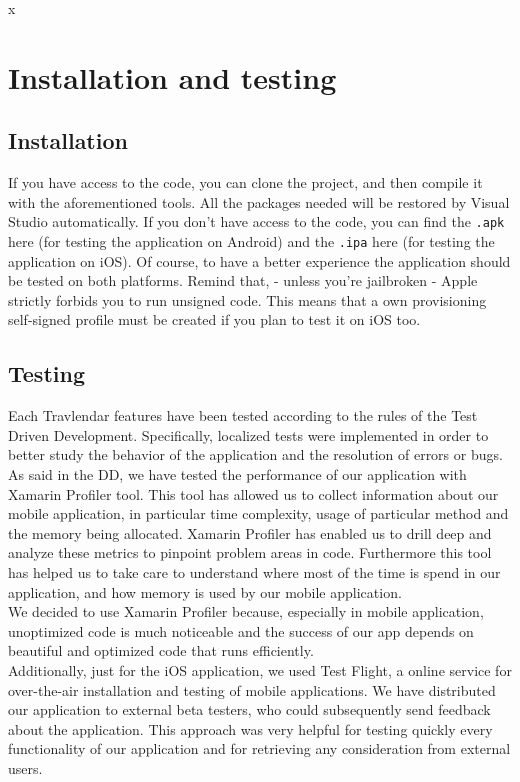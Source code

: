 x\chapter{Installation and testing}
\label{cha:testing}

\section{Installation}
If you have access to the code, you can clone the project, and then compile it with the aforementioned tools. All the packages needed will be restored by Visual Studio automatically. If you don't have access to the code, you can find the \verb|.apk| here (for testing the application on Android) and the \verb|.ipa| here (for testing the application on iOS). Of course, to have a better experience the application should be tested on both platforms. Remind that, - unless you're jailbroken - Apple strictly forbids you to run unsigned code. This means that a own provisioning self-signed profile must be created if you plan to test it on iOS too.

\section{Testing}
Each Travlendar features have been tested according to the rules of the Test Driven Development.
Specifically, localized tests were implemented in order to better study the behavior of the application and the resolution of errors or bugs.\\ 
As said in the DD, we have tested the performance of our application with Xamarin Profiler tool. This tool has allowed us to collect information about our mobile application, in particular time complexity, usage of particular method and the memory being allocated. Xamarin Profiler has enabled us to drill deep and analyze these metrics to pinpoint problem areas in code. Furthermore this tool has helped us to take care to understand where most of the time is spend in our application, and how memory is used by our mobile application.\\
We decided to use Xamarin Profiler because, especially in mobile application, unoptimized code is much noticeable and the success of our app depends on beautiful and optimized code that runs efficiently. \\
Additionally, just for the iOS application, we used Test Flight, a online service for over-the-air installation and testing of mobile applications.
We have distributed our application to external beta testers, who could subsequently send feedback about the application.
This approach was very helpful for testing quickly every functionality of our application and for retrieving any consideration from external users. 



